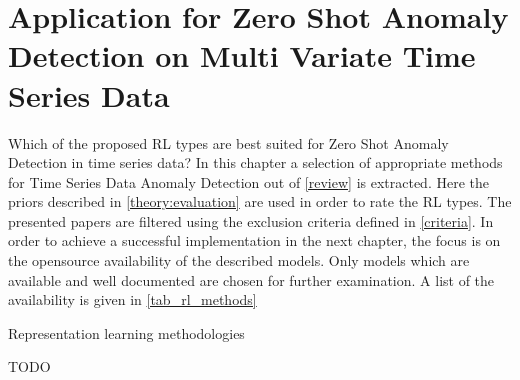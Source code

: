 \section{Application for Zero Shot Anomaly Detection on Multi Variate Time Series Data}\label{application}
 Which of the proposed RL types are best suited for Zero Shot Anomaly Detection in time series data? In this chapter a selection of appropriate methods for Time Series Data Anomaly Detection out of \ref{review} is extracted. Here the priors described in \ref{theory:evaluation} are used in order to rate the RL types. The presented papers are filtered using the exclusion criteria defined in \ref{criteria}.
 In order to achieve a successful implementation in the next chapter, the focus is on the opensource availability of the described models. Only models which are available and well documented are chosen for further examination. A list of the availability is given in \ref{tab_rl_methods}
 \begin{table}
   \caption{Representation learning methodologies}\label{tab_rl_methods}
   
 \end{table}
TODO \cite{fung_model_2024}  %
